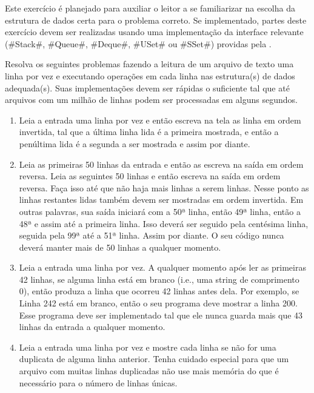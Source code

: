 \begin{exc}
  Este exercício é planejado para auxiliar o leitor a se familiarizar na escolha da estrutura de dados certa para o problema correto. Se implementado, partes deste exercício devem ser realizadas usando uma implementação da interface relevante
  (#Stack#, #Queue#, #Deque#, #USet# ou #SSet#)
  providas pela .

  Resolva os seguintes problemas fazendo a leitura de um arquivo de texto uma linha por vez e executando operações em cada linha nas estrutura(s) de dados adequada(s).
Suas implementações devem ser rápidas o suficiente tal que até arquivos com um milhão de linhas podem ser processadas em alguns segundos.
  \begin{enumerate}
    \item Leia a entrada uma linha por vez e então escreva na tela as linha em ordem invertida, tal que a última linha lida é a primeira mostrada, e então a penúltima lida é a segunda a ser mostrada e assim por diante. 
    \item Leia as primeiras 50 linhas da entrada e então as escreva na saída em ordem reversa. Leia as seguintes 50 linhas e então escreva na saída em ordem reversa. Faça isso até que não haja mais linhas a serem linhas. Nesse ponto as linhas restantes lidas também devem ser mostradas em ordem invertida.
Em outras palavras, sua saída iniciará com a 50ª linha, então 49ª linha, então a 48ª e assim até a primeira linha. Isso deverá ser seguido pela centésima linha, seguida pela 99ª até a 51ª linha. Assim por diante.
O seu código nunca deverá manter mais de 50 linhas a qualquer momento.

\item Leia a entrada uma linha por vez.
  A qualquer momento após ler as primeiras 42 linhas, se alguma linha está em branco (i.e., uma string de comprimento 0), então produza a linha que ocorreu 42 linhas antes dela. Por exemplo, se Linha 242 está em branco, então o seu programa deve mostrar a linha 200. Esse programa deve ser implementado tal que ele nunca guarda mais que 43 linhas da entrada a qualquer momento.

\item Leia a entrada uma linha por vez e mostre cada linha se não for uma duplicata de alguma linha anterior. Tenha cuidado especial para que um arquivo com muitas linhas duplicadas não use mais memória do que é necessário para o número de linhas únicas.


\end{enumerate}
\end{exc}
